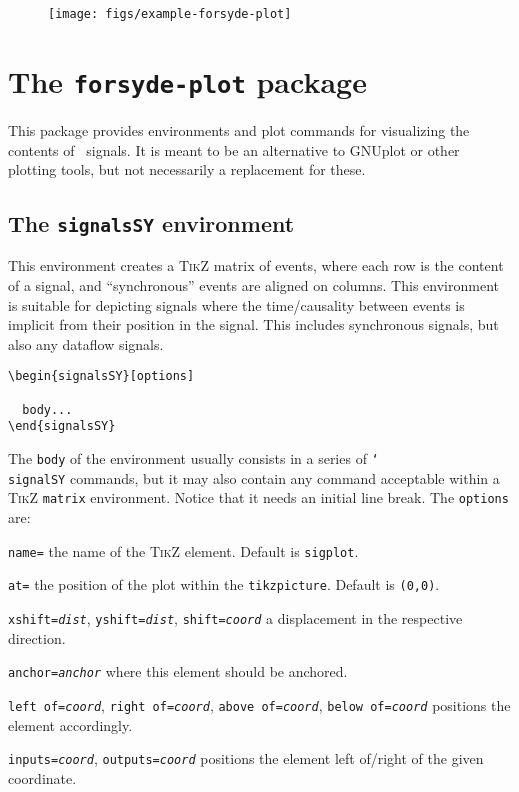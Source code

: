 \begin{figure}[htb]\centering
\texttt{[image: figs/example-forsyde-plot]}
\end{figure}

\newpage

\section{The \texttt{forsyde-plot} package}
\label{sec:forsyde-plot-package}


This package provides environments and plot commands for visualizing the contents of \ForSyDe\ signals. It is meant to be an alternative to GNUplot or other plotting tools, but not necessarily a replacement for these.

\subsection{The \texttt{signalsSY} environment}
\label{sec:plot-signalsSY}

This environment creates a \textsc{TikZ} matrix of events, where each row is the content of a signal, and ``synchronous'' events are aligned on columns. This environment is suitable for depicting signals where the time/causality between events is implicit from their position in the signal. This includes synchronous signals, but also any dataflow signals.

\begin{verbatim}
\begin{signalsSY}[options]

  body...
\end{signalsSY}
\end{verbatim}

The \texttt{body} of the environment usually consists in a series of \texttt{\char`\\signalSY} commands, but it may also contain any command acceptable within a \textsc{TikZ} \texttt{matrix} environment. Notice that it needs an initial line break. The \texttt{options} are:

\begin{optionslist}
\item \texttt{name=} the name of the \textsc{TikZ} element. Default is \texttt{sigplot}.
\item \texttt{at=} the position of the plot within the \texttt{tikzpicture}. Default is \texttt{(0,0)}.
\item \texttt{xshift=\it dist}, \texttt{yshift=\it dist}, \texttt{shift=\it coord} a displacement in the respective direction.
\item \texttt{anchor=\it anchor} where this element should be anchored.
\item \texttt{left of=\it coord}, \texttt{right of=\it coord}, \texttt{above of=\it coord}, \texttt{below of=\it coord} positions the element accordingly.
\item \texttt{inputs=\it coord}, \texttt{outputs=\it coord} positions the element left of/right of the given coordinate.
\end{optionslist}

